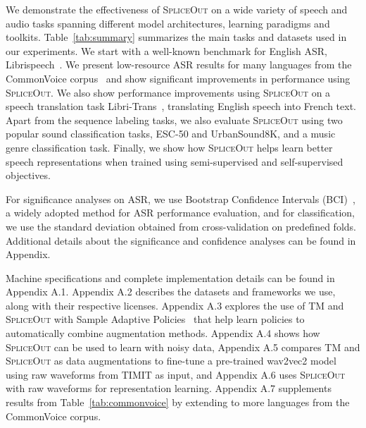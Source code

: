 \documentclass{article}
\newcommand{\SpA}{{\textsc{SpliceOut}}\xspace}
\begin{document}
We demonstrate the effectiveness of \SpA on a wide variety of speech and audio tasks spanning different model architectures,  learning paradigms and toolkits. Table~\ref{tab:summary} summarizes the main tasks and datasets used in our experiments. We start with a well-known benchmark for English ASR, Librispeech~\citep{librispeech}. We present low-resource ASR results for many languages from the CommonVoice corpus~\citep{commonvoice} and show significant improvements in performance using \SpA. We also show performance improvements using \SpA on a speech translation task  Libri-Trans~\citep{libritrans}, translating English speech into French text. Apart from the sequence labeling tasks, we also evaluate \SpA using two popular sound classification tasks, ESC-50 and UrbanSound8K, and a music genre classification task. Finally, we show how \SpA helps learn better speech representations when trained using semi-supervised and self-supervised objectives. 

For significance analyses on ASR, we use Bootstrap Confidence Intervals (BCI)~\citep{bootstrap}, a widely adopted method for ASR performance evaluation, and for classification, we use the standard deviation obtained from cross-validation on predefined folds. Additional details about the significance and confidence analyses can be found in Appendix. 



 Machine specifications and complete implementation details can be found in Appendix A.1. Appendix A.2 describes the datasets and frameworks we use, along with their respective licenses. Appendix A.3 explores the use of TM and \SpA with Sample Adaptive Policies~\citep{sapaugment} that help learn policies to automatically combine augmentation methods. Appendix A.4 shows how \SpA can be used to learn with noisy data, Appendix A.5 compares TM and \SpA as data augmentations to fine-tune a pre-trained wav2vec2 model using raw waveforms from TIMIT as input, and Appendix A.6 uses \SpA with raw waveforms for representation learning. Appendix A.7 supplements results from Table~\ref{tab:commonvoice} by extending to more languages from the CommonVoice corpus. 
\end{document}
